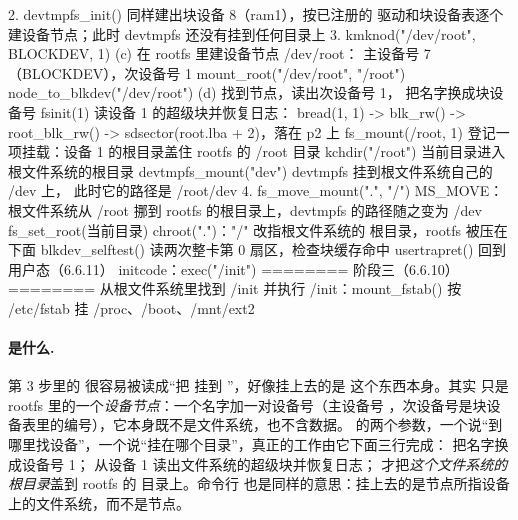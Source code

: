 \begin{txtcode}
    2. devtmpfs_init()                 同样建出块设备 8（ram1），按已注册的
                                       驱动和块设备表逐个建设备节点；此时
                                       devtmpfs 还没有挂到任何目录上
    3. kmknod("/dev/root", BLOCKDEV, 1)
                                  (c)  在 rootfs 里建设备节点 /dev/root：
                                       主设备号 7（BLOCKDEV），次设备号 1
       mount_root("/dev/root", "/root")
         node_to_blkdev("/dev/root")
                                  (d)  找到节点，读出次设备号 1，
                                       把名字换成块设备号
         fsinit(1)                     读设备 1 的超级块并恢复日志：
                                       bread(1, 1) -> blk_rw() -> root_blk_rw()
                                       -> sdsector(root.lba + 2)，落在 p2 上
         fs_mount(/root, 1)            登记一项挂载：设备 1 的根目录盖住
                                       rootfs 的 /root 目录
       kchdir("/root")                 当前目录进入根文件系统的根目录
       devtmpfs_mount("dev")           devtmpfs 挂到根文件系统自己的 /dev 上，
                                       此时它的路径是 /root/dev
    4. fs_move_mount(".", "/")         MS_MOVE：根文件系统从 /root 挪到 rootfs
                                       的根目录上，devtmpfs 的路径随之变为 /dev
       fs_set_root(当前目录)           chroot(".")："/" 改指根文件系统的
                                       根目录，rootfs 被压在下面
  blkdev_selftest()                    读两次整卡第 0 扇区，检查块缓存命中
  usertrapret()                        回到用户态（6.6.11）
initcode：exec("/init")                ======== 阶段三（6.6.10）========
                                       从根文件系统里找到 /init 并执行
  /init：mount_fstab()                 按 /etc/fstab 挂 /proc、/boot、/mnt/ext2
\end{txtcode}

\paragraph{ 是什么.} 第 3 步里的  很容易被读成“把  挂到 ”，好像挂上去的是  这个东西本身。其实  只是 rootfs 里的一个\emph{设备节点}：一个名字加一对设备号（主设备号 ，次设备号是块设备表里的编号），它本身既不是文件系统，也不含数据。 的两个参数，一个说“到哪里找设备”，一个说“挂在哪个目录”，真正的工作由它下面三行完成： 把名字换成设备号 1； 从设备 1 读出文件系统的超级块并恢复日志； 才把\emph{这个文件系统的根目录}盖到 rootfs 的  目录上。命令行  也是同样的意思：挂上去的是节点所指设备上的文件系统，而不是节点。

